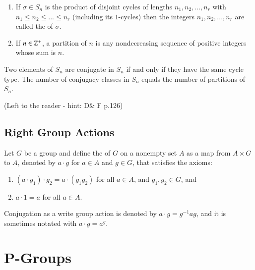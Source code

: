\documentclass[12pt, a4paper, twoside, openright, titlepage]{book}
\begin{document}
\begin{defn}{}{}
    \leavevmode
    \begin{enumerate}
        \item If $\sigma \in S_n$ is the product of disjoint cycles of lengths $n_1,n_2,..., n_r$ with $n_1\leq n_2\leq ...\leq n_r$ (including its $1$-cycles) then the integers $n_1,n_2,...,n_r$ are called the  of $\sigma$.
        \item If $n \in \mathbb Z^+$, a partition of $n$ is any nondecreasing sequence of positive integers whose sum is $n$.
    \end{enumerate}
\end{defn}


\begin{prop}{}{}
    Two elements of $S_n$ are conjugate in $S_n$ if and only if they have the same cycle type. The number of conjugacy classes in $S_n$ equals the number of partitions of $S_n$.
\end{prop}
\begin{proof*}{}{}
    (Left to the reader - hint: D\& F p.126)
\end{proof*}


\subsection{\textsection Right Group Actions}

\begin{defn}{}{}
    Let $G$ be a group and define the  of $G$ on a nonempty set $A$ as a map from $A\times G$ to $A$, denoted by $a\cdot g$ for $a \in A$ and $g\in G$, that satisfies the axioms: \begin{enumerate}
        \item $(a\cdot g_1)\cdot g_2 = a\cdot(g_1g_2)$ for all $a \in A$, and $g_1,g_2 \in G$, and 
        \item $a\cdot 1 = a$ for all $a \in A$.
    \end{enumerate}
\end{defn}

\begin{rmk}{}{}
    Conjugation as a write group action is denoted by $a \cdot g = g^{-1}ag$, and it is sometimes notated with $a\cdot g = a^g$.
\end{rmk}


\section{\textsection P-Groups}
\end{document}
